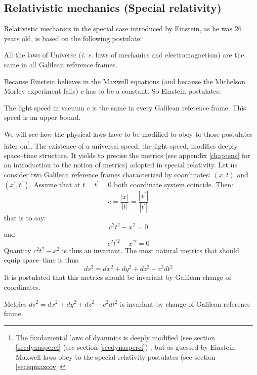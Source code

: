 \documentclass[12pt]{book}
\begin{document}
\subsection{Relativistic mechanics (Special relativity)}\label{secrelat} 
Relativistic mechanics in the special case introduced by Einstein, as
he was 26 years old, is based on the following postulate: 
\begin{postulat}
All the laws of Universe ({\it i. e. }laws of mechanics and electromagnetism) are the same in all Galilean reference frames.
\end{postulat}
Because Einstein believes in the Maxwell equations (and because the
Michelson Morley experiment fails) $c$ has to be a constant. So
Einstein postulates:
\begin{postulat}
The light speed in vacuum $c$ is the same in every Galilean
reference frame. This speed is an upper bound.
\end{postulat}
We will see how the physical laws have to be modified to obey to
those postulates later on\footnote{The fundamental laws of dyanmics
is deeply modified (see section \ref{secdynasperel} (see section
\ref{secdynasperel})
, but as guessed by Einstein
Maxwell laws obey to the special relativity postulates (see section
\ref{seceqmaxcov}.
}.
The existence of a universal speed, the light speed, modifies deeply
space--time structure.
 It yields to precise the metrics
 (see appendix \ref{chaptens} for an introduction to the notion of
metrics) adopted in special relativity. Let us consider two Galilean
reference frames characterized by coordinates:
$(x,t)$ and $(x^\prime,t^\prime)$. Assume that at $t=t^\prime=0$ both
coordinate system coincide. Then:
\begin{equation}
c=\frac{|x|}{|t|}=\frac{|x^\prime|}{|t^\prime|}
\end{equation}
that is to say:
\begin{equation}
c^2t^2-x^2=0
\end{equation}
and
\begin{equation}
c^2t^{\prime 2}-x^{\prime 2}=0
\end{equation}
Quantity $c^2t^2-x^2$ is thus an invariant.
The most natural metrics that should equip space--time is thus:
\begin{equation}
ds^2=dx^2+dy^2+dz^2-c^2dt^2
\end{equation}
It is postulated that this metrics should be invariant by Galilean change of
coordinates. 
\begin{postulat}
Metrics $ds^2=dx^2+dy^2+dz^2-c^2dt^2$ is invariant by change of Galilean
reference frame. 
\end{postulat}
\end{document}
